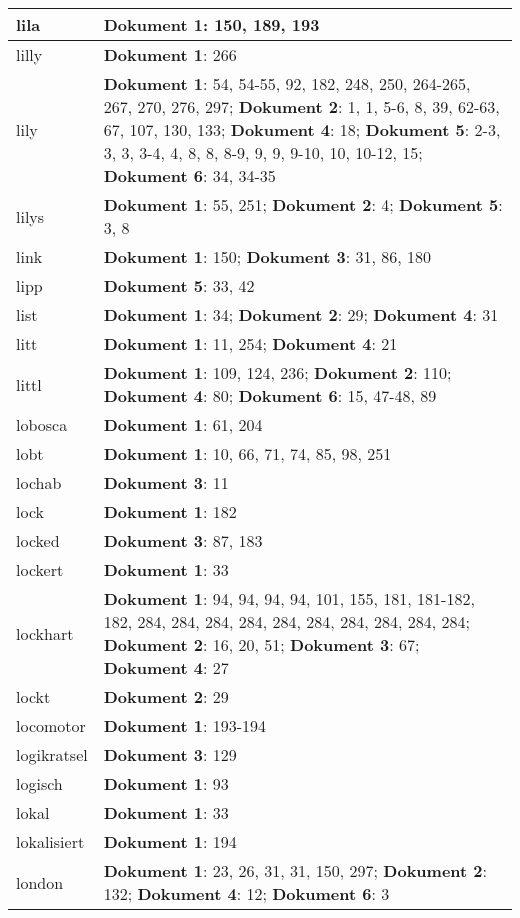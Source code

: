 \documentclass[a5paper]{article}
\begin{document}
\begin{longtable}[l]{|l|p{3in}|}
\hline
lila & \textbf{Dokument 1}: 150, 189, 193 \\
\hline
lilly & \textbf{Dokument 1}: 266 \\
\hline
lily & \textbf{Dokument 1}: 54, 54-55, 92, 182, 248, 250, 264-265, 267, 270, 276, 297; \textbf{Dokument 2}: 1, 1, 5-6, 8, 39, 62-63, 67, 107, 130, 133; \textbf{Dokument 4}: 18; \textbf{Dokument 5}: 2-3, 3, 3, 3-4, 4, 8, 8, 8-9, 9, 9, 9-10, 10, 10-12, 15; \textbf{Dokument 6}: 34, 34-35 \\
\hline
lilys & \textbf{Dokument 1}: 55, 251; \textbf{Dokument 2}: 4; \textbf{Dokument 5}: 3, 8 \\
\hline
link & \textbf{Dokument 1}: 150; \textbf{Dokument 3}: 31, 86, 180 \\
\hline
lipp & \textbf{Dokument 5}: 33, 42 \\
\hline
list & \textbf{Dokument 1}: 34; \textbf{Dokument 2}: 29; \textbf{Dokument 4}: 31 \\
\hline
litt & \textbf{Dokument 1}: 11, 254; \textbf{Dokument 4}: 21 \\
\hline
littl & \textbf{Dokument 1}: 109, 124, 236; \textbf{Dokument 2}: 110; \textbf{Dokument 4}: 80; \textbf{Dokument 6}: 15, 47-48, 89 \\
\hline
lobosca & \textbf{Dokument 1}: 61, 204 \\
\hline
lobt & \textbf{Dokument 1}: 10, 66, 71, 74, 85, 98, 251 \\
\hline
lochab & \textbf{Dokument 3}: 11 \\
\hline
lock & \textbf{Dokument 1}: 182 \\
\hline
locked & \textbf{Dokument 3}: 87, 183 \\
\hline
lockert & \textbf{Dokument 1}: 33 \\
\hline
lockhart & \textbf{Dokument 1}: 94, 94, 94, 94, 101, 155, 181, 181-182, 182, 284, 284, 284, 284, 284, 284, 284, 284, 284, 284; \textbf{Dokument 2}: 16, 20, 51; \textbf{Dokument 3}: 67; \textbf{Dokument 4}: 27 \\
\hline
lockt & \textbf{Dokument 2}: 29 \\
\hline
locomotor & \textbf{Dokument 1}: 193-194 \\
\hline
logikratsel & \textbf{Dokument 3}: 129 \\
\hline
logisch & \textbf{Dokument 1}: 93 \\
\hline
lokal & \textbf{Dokument 1}: 33 \\
\hline
lokalisiert & \textbf{Dokument 1}: 194 \\
\hline
london & \textbf{Dokument 1}: 23, 26, 31, 31, 150, 297; \textbf{Dokument 2}: 132; \textbf{Dokument 4}: 12; \textbf{Dokument 6}: 3 \\

\end{longtable}
\end{document}

